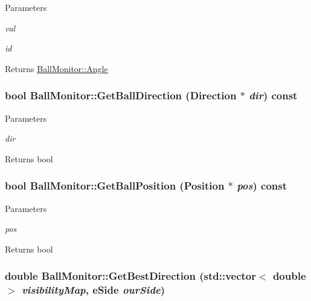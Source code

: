 \begin{DoxyParams}{Parameters}
\item[{\em val}]\item[{\em id}]\end{DoxyParams}
\begin{DoxyReturn}{Returns}
\hyperlink{structBallMonitor_1_1Angle}{BallMonitor::Angle} 
\end{DoxyReturn}
\hypertarget{classBallMonitor_a3cd2fe1ed297c468634fbb390ca088bd}{
\subsubsection[{GetBallDirection}]{\setlength{\rightskip}{0pt plus 5cm}bool BallMonitor::GetBallDirection ({\bf Direction} $\ast$ {\em dir}) const}}
\label{classBallMonitor_a3cd2fe1ed297c468634fbb390ca088bd}

\begin{DoxyParams}{Parameters}
\item[{\em dir}]\end{DoxyParams}
\begin{DoxyReturn}{Returns}
bool 
\end{DoxyReturn}
\hypertarget{classBallMonitor_aab81815271c442087c15bc8f6843d092}{
\subsubsection[{GetBallPosition}]{\setlength{\rightskip}{0pt plus 5cm}bool BallMonitor::GetBallPosition (Position $\ast$ {\em pos}) const}}
\label{classBallMonitor_aab81815271c442087c15bc8f6843d092}

\begin{DoxyParams}{Parameters}
\item[{\em pos}]\end{DoxyParams}
\begin{DoxyReturn}{Returns}
bool 
\end{DoxyReturn}
\hypertarget{classBallMonitor_a9045d5d3abf9c9b549303c831b3387e0}{
\subsubsection[{GetBestDirection}]{\setlength{\rightskip}{0pt plus 5cm}double BallMonitor::GetBestDirection (std::vector$<$ double $>$ {\em visibilityMap}, \/  eSide {\em ourSide})}}
\label{classBallMonitor_a9045d5d3abf9c9b549303c831b3387e0}


